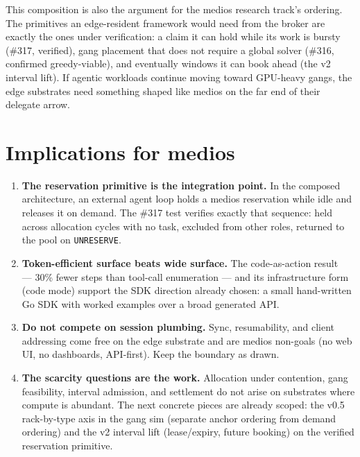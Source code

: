 \documentclass[11pt]{article}
\newcommand{\code}[1]{\texttt{#1}}
\begin{document}
This composition is also the argument for the medios research track's
ordering. The primitives an edge-resident framework would need from the
broker are exactly the ones under verification: a claim it can hold while
its work is bursty (\#317, verified), gang placement that does not require
a global solver (\#316, confirmed greedy-viable), and eventually windows it
can book ahead (the v2 interval lift). If agentic workloads continue moving
toward GPU-heavy gangs, the edge substrates need something shaped like
medios on the far end of their delegate arrow.

\section{Implications for medios}

\begin{enumerate}
\item \textbf{The reservation primitive is the integration point.} In the
  composed architecture, an external agent loop holds a medios reservation
  while idle and releases it on demand. The \#317 test verifies exactly
  that sequence: held across allocation cycles with no task, excluded from
  other roles, returned to the pool on \code{UNRESERVE}.
\item \textbf{Token-efficient surface beats wide surface.} The
  code-as-action result~\cite{codeact} --- 30\% fewer steps than tool-call
  enumeration --- and its infrastructure form (code mode) support the SDK
  direction already chosen: a small hand-written Go SDK with worked
  examples over a broad generated API.
\item \textbf{Do not compete on session plumbing.} Sync, resumability, and
  client addressing come free on the edge substrate and are medios
  non-goals (no web UI, no dashboards, API-first). Keep the boundary as
  drawn.
\item \textbf{The scarcity questions are the work.} Allocation under
  contention, gang feasibility, interval admission, and settlement do not
  arise on substrates where compute is abundant. The next concrete pieces
  are already scoped: the v0.5 rack-by-type axis in the gang sim (separate
  anchor ordering from demand ordering) and the v2 interval lift
  (lease/expiry, future booking) on the verified reservation primitive.
\end{enumerate}
\end{document}

